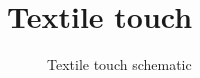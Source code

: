 \section{Textile touch}
\label{app:textile-touch}

\begin{landscape}
	\thispagestyle{empty}
	\centering
	\begin{figure}[p]
	    \caption{Textile touch schematic}
	\end{figure}
\end{landscape}